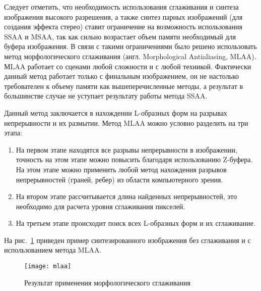 Следует отметить, что необходимость использования сглаживания и синтеза изображения высокого разрешения, а также синтез парных изображений (для создания эффекта стерео) ставит ограничение на возможность использования SSAA и MSAA, так как сильно возрастает объем памяти необходимый для буфера изображения. В связи с такими ограничениями было решено использовать метод морфологического сглаживания (англ. Morphological Antialiasing, MLAA)\citep{mlaa}. МLAA работает со сценами любой сложности и с любой техникой. Фактически данный метод работает только с финальным изображением, он не настолько требователен к объему памяти как вышеперечисленные методы, а результат в большинстве случае не уступает результату работы метода SSAA. 

Данный метод заключается в нахождении \glqq L\grqq-образных форм на  разрывах непрерывности и их размытии. Метод MLAA можно условно разделить на три этапа: 

\begin{enumerate}
	\item	На первом этапе находятся все разрывы непрерывности в изображении, 
			точность на этом этапе можно повысить благодаря использованию Z-буфера. 
			На этом этапе можно применить любой метод нахождения разрывов непрерывностей 
			(граней, ребер) из области компьютерного зрения.
	\item	На втором этапе рассчитывается длина найденных непрерывностей, это необходимо 
			для расчета уровня сглаживания пикселей. 
	\item	На третьем этапе происходит поиск всех \glqq L\grqq-образных форм и их сглаживание.
\end{enumerate}

На рис.~\ref{mlaa} приведен пример синтезированного изображения без сглаживания и с использованием метода MLAA.

\begin{figure}[ht]
\begin{center}
\texttt{[image: mlaa]}
\end{center}
\caption{Результат применения морфологического сглаживания}
\label{mlaa}
\end{figure}






